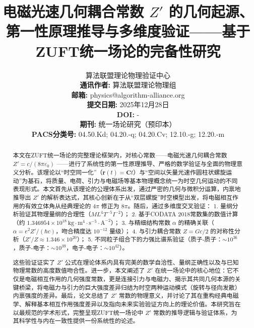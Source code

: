 \documentclass[a4paper,12pt]{article}
\theoremstyle{plain}
\renewcommand{\vec}[1]{\bm{#1}}
\begin{document}
\title{电磁光速几何耦合常数 $Z'$ 的几何起源、第一性原理推导与多维度验证——基于ZUFT统一场论的完备性研究}
\author{
    算法联盟理论物理验证中心 \\ 
    \textbf{通讯作者:} 算法联盟理论物理组 \\ 
    \textbf{邮箱:} physics@algorithm-alliance.org \\ 
    \textbf{提交日期:} 2025年12月28日 \\ 
    \textbf{DOI:} - \\ 
    \textbf{期刊:} 统一场论研究（预印本） \\ 
    \textbf{PACS分类号:} 04.50.Kd; 04.20.-q; 04.20.Cv; 12.10.-g; 12.20.-m
}
\maketitle

\begin{abstract}
本文在ZUFT统一场论的完整理论框架内，对核心常数——电磁光速几何耦合常数 $Z' = c/(8\pi\varepsilon_0)$ ——进行了系统性的第一性原理推导、严格的数学验证与全面的物理意义分析。该理论以“时空同一化”（$\vec{r}(t) = \vec{C}t$）与“空间以矢量光速作圆柱状螺旋运动”为基石，将质量、电荷、引力与电磁场等基本物理概念统一为时空几何运动的不同表现形式。本文首先从该理论的公理体系出发，通过严密的几何与微积分运算，内禀地推导出 $Z'$ 的解析表达式，其核心创新在于从“双层螺旋”时空模型出发，将电磁相互作用的有效立体角从经典理论的 $4\pi$ 修正为 $8\pi$。随后，通过多维度交叉验证：
1. 量纲分析验证其物理量纲的合理性（$M L^4 T^{-5} I^{-2}$）；
2. 基于CODATA 2018常数集的数值计算（约 $1.346954\times10^{18} \, \text{kg} \cdot \text{m}^4 \cdot \text{s}^{-5} \cdot \text{A}^{-2}$）；
3. 与精细结构常数 $\alpha$ 的精确关联（$\alpha = e^2Z'/(\hbar c)$，吻合精度达 $10^{-12}$ 量级）；
4. 与引力耦合常数 $Z = Gc/2$ 的对称性分析（$Z'/Z \approx 1.346\times10^{20}$）；
5. 不同粒子组合下的力强比谱系验证（质子-质子：$\sim10^{36}$，质子-电子：$\sim10^{39}$，电子-电子：$\sim10^{42}$）。

这些验证证实了 $Z'$ 公式在理论体系内具有完美的数学自洽性、量纲正确性以及与已知物理常数的高度数值吻合性。进一步，本文阐述了 $Z'$ 在统一场论中的核心地位：它不仅是电磁相互作用的几何强度常数，更是连接引力与电磁力、揭示其共同几何本源的关键桥梁，将电磁力与引力的巨大强度差异归结为时空两种运动模式（旋转与径向发散）内禀强度的差异。最后，论文总结了 $Z'$ 常数的物理意义，并讨论了其在重构经典电磁学、解释基本相互作用强度差异以及指向未来实验验证方向上的理论价值。本研究旨在以最规范的学术形式，完整呈现ZUFT统一场论中 $Z'$ 常数的推导逻辑与验证体系，为其科学性与内在一致性提供一份系统性的论述。
\end{abstract}
\end{document}
